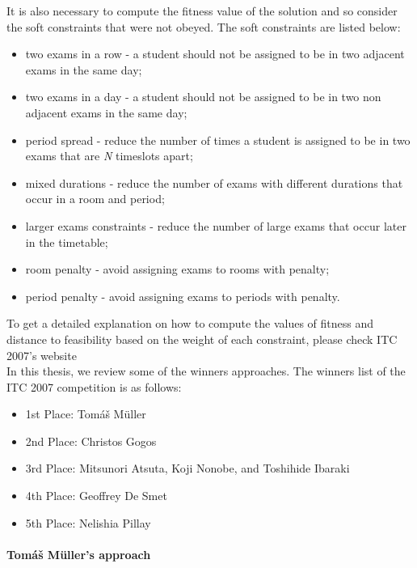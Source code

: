 It is also necessary to compute the fitness value of the solution and so consider the soft constraints that were not obeyed. The soft constraints are listed below:
\begin{itemize}
	\item two exams in a row - a student should not be assigned to be in two adjacent exams in the same day;
	\item two exams in a day - a student should not be assigned to be in two non adjacent exams in the same day;
	\item period spread - reduce the number of times a student is assigned to be in two exams that are \textit{N} timeslots apart;
	\item mixed durations - reduce the number of exams with different durations that occur in a room and period;
	\item larger exams constraints - reduce the number of large exams that occur later in the timetable;
	\item room penalty - avoid assigning exams to rooms with penalty;
	\item period penalty - avoid assigning exams to periods with penalty.
\end{itemize}

To get a detailed explanation on how to compute the values of fitness and distance to feasibility based on the weight of each constraint, please check ITC 2007's website~\cite{McCollum2008}\\


In this thesis, we review some of the winners approaches. The winners list of the ITC 2007 competition is as follows:
\begin{itemize}
	\item 1st Place: Tom\'{a}\v{s} M\"{u}ller
	\item 2nd Place: Christos Gogos
	\item 3rd Place: Mitsunori Atsuta, Koji Nonobe, and Toshihide Ibaraki
	\item 4th Place: Geoffrey De Smet
	\item 5th Place: Nelishia Pillay
\end{itemize}

\paragraph{Tom\'{a}\v{s} M\"{u}ller's approach}

